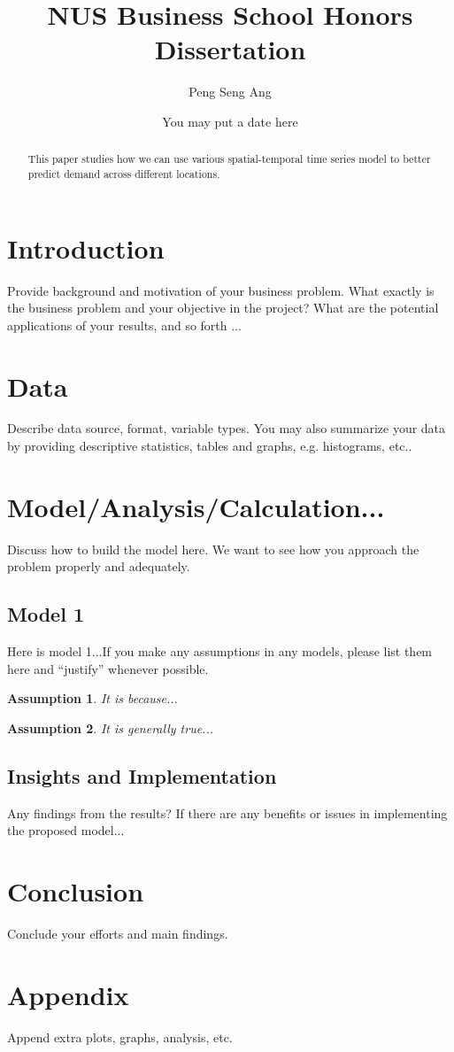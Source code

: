 \documentclass[10pt, letterpaper] {article}
\newtheorem{assumption}{Assumption}
\begin{document}
	\title{NUS Business School Honors Dissertation}
	\author{Peng Seng Ang}
	\date{You may put a date here}
	\maketitle
\begin{abstract}
This paper studies how we can use various spatial-temporal time series model to better predict demand across different locations. 
\end{abstract}
\section{Introduction}
Provide background and motivation of your business problem. What exactly is the business problem and your objective in the project? What are the potential applications of your results, and so forth ...
\section{Data}
Describe data source, format, variable types. You may also summarize your data by providing descriptive statistics, tables and graphs, e.g. histograms, etc..
\section{Model/Analysis/Calculation...}
Discuss how to build the model here. We want to see how you approach the problem properly and adequately.
\subsection{Model 1}
Here is model 1...If you make any assumptions in any models, please list them here and ``justify'' whenever possible.
\begin{assumption}
It is because...
\end{assumption}
\begin{assumption}
It is generally true...
\end{assumption}
\subsection{Insights and Implementation}
Any findings from the results? If there are any benefits or issues in implementing the proposed model...
\section{Conclusion}
Conclude your efforts and main findings.
\section{Appendix}
Append extra plots, graphs, analysis, etc.
\end{document}

